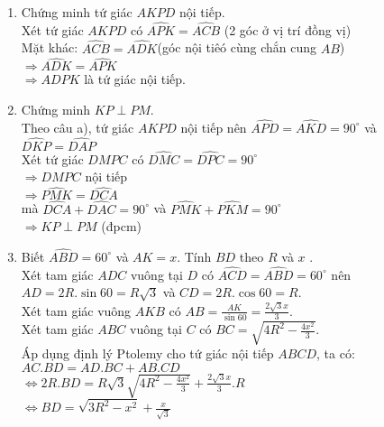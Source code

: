 \begin{bt}
{	\begin{enumerate}
        \item Chứng minh tứ giác $AKPD$ nội tiếp.\\
        Xét tứ giác $AKPD$ có $\widehat{APK}=\widehat{ACB}$ (2 góc ở vị trí đồng vị)\\
        Mặt khác: $\widehat{ACB}=\widehat{ADK}$(góc nội tiêó cùng chắn cung $AB$)\\
        $\Rightarrow \widehat{ADK}=\widehat{APK}$\\
        $\Rightarrow ADPK$ là tứ giác nội tiếp.        
        \item Chứng minh $KP \perp PM$.\\
        Theo câu a), tứ giác $AKPD$ nội tiếp nên $\widehat{APD}=\widehat{AKD}=90^ \circ$ và $\widehat{DKP}=\widehat{DAP}$\\
        Xét tứ giác $DMPC$ có $\widehat{DMC}=\widehat{DPC}=90^ \circ$\\
        $\Rightarrow DMPC$ nội tiếp\\
        $\Rightarrow \widehat{PMK}=\widehat{DCA}$\\
        mà $\widehat{DCA}+\widehat{DAC}=90^ \circ$ và $\widehat{PMK}+\widehat{PKM}=90^ \circ$\\
        $\Rightarrow KP \perp PM$ (đpcm) 
               
        \item Biết $\widehat{ABD}=60^ \circ$ và $AK=x$. Tính $BD$ theo $R$ và $x$ .\\
        Xét tam giác $ADC$ vuông tại $D$ có $\widehat{ACD}= \widehat{ABD}= 60^ \circ$ nên\\
        $AD=2R. \sin 60 = R \sqrt{3}$ và $CD= 2R. \cos 60 = R$.\\
        Xét tam giác vuông $AKB$ có $AB= \displaystyle \frac{AK}{\sin 60}= \displaystyle \frac{2\sqrt{3}x}{3}$.\\
        Xét tam giác $ABC$ vuông tại $C$ có $BC=\sqrt{4R^2- \displaystyle \frac{4x^2}{3}}$.\\
        Áp dụng định lý Ptolemy cho tứ giác nội tiếp $ABCD$, ta có:\\
        $AC.BD=AD.BC+AB.CD$\\
        $\Leftrightarrow 2R.BD=R \sqrt{3} \sqrt{4R^2 - \displaystyle \frac{4x^2}{3}}+ \displaystyle \frac{2\sqrt{3}x}{3}.R$\\
        $\Leftrightarrow BD= \sqrt{3R^2-x^2}+\displaystyle \frac{x}{\sqrt{3}}$
    \end{enumerate}
    }
\end{bt}

